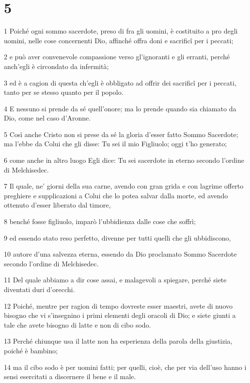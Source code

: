 \chapter{5}

\par 1 Poiché ogni sommo sacerdote, preso di fra gli uomini, è costituito a pro degli uomini, nelle cose concernenti Dio, affinché offra doni e sacrificî per i peccati;
\par 2 e può aver convenevole compassione verso gl'ignoranti e gli erranti, perché anch'egli è circondato da infermità;
\par 3 ed è a cagion di questa ch'egli è obbligato ad offrir dei sacrificî per i peccati, tanto per se stesso quanto per il popolo.
\par 4 E nessuno si prende da sé quell'onore; ma lo prende quando sia chiamato da Dio, come nel caso d'Aronne.
\par 5 Così anche Cristo non si prese da sé la gloria d'esser fatto Sommo Sacerdote; ma l'ebbe da Colui che gli disse: Tu sei il mio Figliuolo; oggi t'ho generato;
\par 6 come anche in altro luogo Egli dice: Tu sei sacerdote in eterno secondo l'ordine di Melchisedec.
\par 7 Il quale, ne' giorni della sua carne, avendo con gran grida e con lagrime offerto preghiere e supplicazioni a Colui che lo potea salvar dalla morte, ed avendo ottenuto d'esser liberato dal timore,
\par 8 benché fosse figliuolo, imparò l'ubbidienza dalle cose che soffrì;
\par 9 ed essendo stato reso perfetto, divenne per tutti quelli che gli ubbidiscono,
\par 10 autore d'una salvezza eterna, essendo da Dio proclamato Sommo Sacerdote secondo l'ordine di Melchisedec.
\par 11 Del quale abbiamo a dir cose assai, e malagevoli a spiegare, perché siete diventati duri d'orecchi.
\par 12 Poiché, mentre per ragion di tempo dovreste esser maestri, avete di nuovo bisogno che vi s'insegnino i primi elementi degli oracoli di Dio; e siete giunti a tale che avete bisogno di latte e non di cibo sodo.
\par 13 Perché chiunque usa il latte non ha esperienza della parola della giustizia, poiché è bambino;
\par 14 ma il cibo sodo è per uomini fatti; per quelli, cioè, che per via dell'uso hanno i sensi esercitati a discernere il bene e il male.

